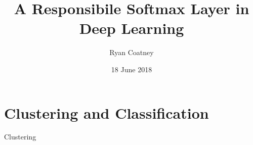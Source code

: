 \documentclass{beamer}
\title[Responsible Softmax]{A Responsibile Softmax Layer in Deep Learning}
\author{Ryan Coatney}
\institute{\tiny{University of Arizona}}
\date{18 June 2018}
\begin{document}
	\maketitle
	
	\section{Clustering and Classification}
	\begin{frame}{Clustering}
		\begin{figure}
			\centering
			\begin{subfigure}{.7\linewidth}
				
			\end{subfigure}
			\pause
			\begin{subfigure}{.7\linewidth}
				\ \\
			\end{subfigure}
			\begin{subfigure}{.7\linewidth}
				
			\end{subfigure}
		\end{figure}
	\end{frame}
\end{document}
